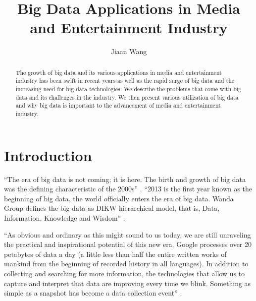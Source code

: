 \documentclass[sigconf]{acmart}
\begin{document}
\title{Big Data Applications in Media and Entertainment Industry}


\author{Jiaan Wang}


\begin{abstract}

    The growth of big data and its various applications in media and entertainment 
    industry has been swift in recent years as well as the rapid surge of big data 
    and the increasing need for big data technologies. We describe the problems 
    that come with big data and its challenges in the industry. We then present 
    various utilization of big data and why big data is important to the advancement 
    of media and entertainment industry. 
    
\end{abstract}


\maketitle

\section{Introduction}

``The era of big data is not coming; it is here. The birth and growth of big data was the defining characteristic of the 2000s'' \cite{Schlieski2012data}. ``2013 is the first year known as the beginning of big data, the world officially enters the era of big data. Wanda Group defines the big data as DIKW hierarchical model, that is, Data, Information, Knowledge and Wisdom'' \cite{Zhang2017era}.

``As obvious and ordinary as this might sound to us today, we are still unraveling the practical and inspirational potential of this new era. Google processes over 20 petabytes of data a day (a little less than half the entire written works of mankind from the beginning of recorded history in all languages). In addition to collecting and searching for more information, the technologies that allow us to capture and interpret that data are improving every time we blink. Something as simple as a snapshot has become a data collection event'' \cite{Schlieski2012data}.
\end{document}
